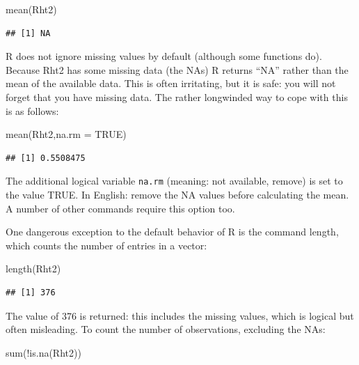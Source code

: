 \documentclass[
]{book}
\newenvironment{Shaded}{\begin{snugshade}}{\end{snugshade}}
\newcommand{\AttributeTok}[1]{\textcolor[rgb]{0.77,0.63,0.00}{#1}}
\newcommand{\ConstantTok}[1]{\textcolor[rgb]{0.00,0.00,0.00}{#1}}
\newcommand{\FunctionTok}[1]{\textcolor[rgb]{0.00,0.00,0.00}{#1}}
\newcommand{\NormalTok}[1]{#1}
\newcommand{\SpecialCharTok}[1]{\textcolor[rgb]{0.00,0.00,0.00}{#1}}
\begin{document}
\begin{Shaded}
\begin{Highlighting}[]
\FunctionTok{mean}\NormalTok{(Rht2)}
\end{Highlighting}
\end{Shaded}

\begin{verbatim}
## [1] NA
\end{verbatim}

R does not ignore missing values by default (although some functions do). Because Rht2 has some missing data (the NAs) R returns ``NA'' rather than the mean of the available data. This is often irritating, but it is safe: you will not forget that you have missing data. The rather longwinded way to cope with this is as follows:

\begin{Shaded}
\begin{Highlighting}[]
\FunctionTok{mean}\NormalTok{(Rht2,}\AttributeTok{na.rm =} \ConstantTok{TRUE}\NormalTok{)}
\end{Highlighting}
\end{Shaded}

\begin{verbatim}
## [1] 0.5508475
\end{verbatim}

The additional logical variable \texttt{na.rm} (meaning: not available, remove) is set to the value TRUE. In English: remove the NA values before calculating the mean. A number of other commands require this option too.

One dangerous exception to the default behavior of R is the command length, which counts the number of entries in a vector:

\begin{Shaded}
\begin{Highlighting}[]
\FunctionTok{length}\NormalTok{(Rht2)}
\end{Highlighting}
\end{Shaded}

\begin{verbatim}
## [1] 376
\end{verbatim}

The value of 376 is returned: this includes the missing values, which is logical but often misleading. To count the number of observations, excluding the NAs:

\begin{Shaded}
\begin{Highlighting}[]
\FunctionTok{sum}\NormalTok{(}\SpecialCharTok{!}\FunctionTok{is.na}\NormalTok{(Rht2))}
\end{Highlighting}
\end{Shaded}
\end{document}
